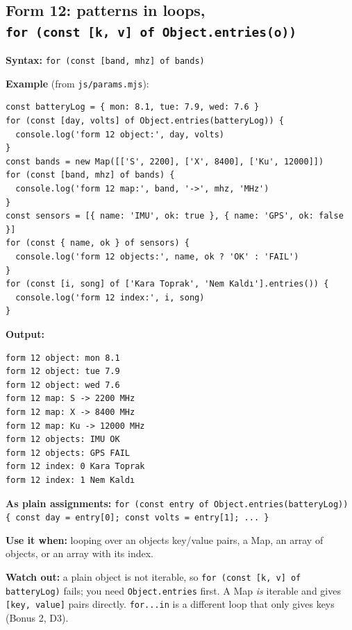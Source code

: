 \hypertarget{form-12-patterns-in-loops-for-const-k-v-of-objectentrieso}{%
\subsection{\texorpdfstring{Form 12: patterns in loops, \texttt{for\ (const\ {[}k,\ v{]}\ of\ Object.entries(o))}}{Form 12: patterns in loops, for (const {[}k, v{]} of Object.entries(o))}}\label{form-12-patterns-in-loops-for-const-k-v-of-objectentrieso}}

\textbf{Syntax:} \passthrough{\lstinline!for (const [band, mhz] of bands)!}

\textbf{Example} (from \passthrough{\lstinline!js/params.mjs!}):

\begin{lstlisting}
const batteryLog = { mon: 8.1, tue: 7.9, wed: 7.6 }
for (const [day, volts] of Object.entries(batteryLog)) {
  console.log('form 12 object:', day, volts)
}
const bands = new Map([['S', 2200], ['X', 8400], ['Ku', 12000]])
for (const [band, mhz] of bands) {
  console.log('form 12 map:', band, '->', mhz, 'MHz')
}
const sensors = [{ name: 'IMU', ok: true }, { name: 'GPS', ok: false }]
for (const { name, ok } of sensors) {
  console.log('form 12 objects:', name, ok ? 'OK' : 'FAIL')
}
for (const [i, song] of ['Kara Toprak', 'Nem Kaldı'].entries()) {
  console.log('form 12 index:', i, song)
}
\end{lstlisting}

\textbf{Output:}

\begin{lstlisting}
form 12 object: mon 8.1
form 12 object: tue 7.9
form 12 object: wed 7.6
form 12 map: S -> 2200 MHz
form 12 map: X -> 8400 MHz
form 12 map: Ku -> 12000 MHz
form 12 objects: IMU OK
form 12 objects: GPS FAIL
form 12 index: 0 Kara Toprak
form 12 index: 1 Nem Kaldı
\end{lstlisting}

\textbf{As plain assignments:} \passthrough{\lstinline!for (const entry of Object.entries(batteryLog)) \{ const day = entry[0]; const volts = entry[1]; ... \}!}

\textbf{Use it when:} looping over an object\textquotesingle s key/value pairs, a Map, an array of objects, or an array with its index.

\textbf{Watch out:} a plain object is not iterable, so \passthrough{\lstinline!for (const [k, v] of batteryLog)!} fails; you need \passthrough{\lstinline!Object.entries!} first. A Map \emph{is} iterable and gives \passthrough{\lstinline![key, value]!} pairs directly. \passthrough{\lstinline!for...in!} is a different loop that only gives keys (Bonus 2, D3).

